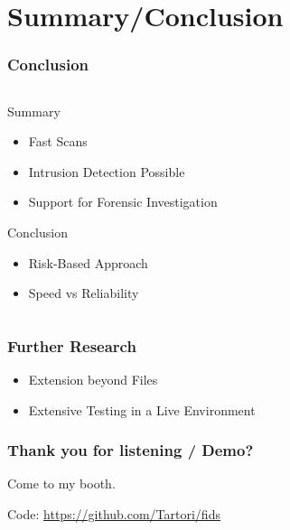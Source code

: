 \documentclass{beamer}
\begin{document}
\section{Summary/Conclusion}

\begin{frame}[fragile]
  \frametitle{Conclusion}
  \begin{columns}
    \begin{column}{1\textwidth}
      Summary
      \begin{itemize}
          \item Fast Scans
          \item Intrusion Detection Possible
          \item Support for Forensic Investigation
      \end{itemize}
      \pause
      Conclusion
      \begin{itemize}
        \item Risk-Based Approach
        \item Speed vs Reliability
      \end{itemize}
    \end{column}
  \end{columns}
\end{frame}

\begin{frame}[fragile]
  \frametitle{Further Research}
    \begin{itemize}
      \item Extension beyond Files
      \item Extensive Testing in a Live Environment
    \end{itemize}
\end{frame}


\begin{frame}
  \frametitle{Thank you for listening / Demo?}
  Come to my booth.

  Code: \url{https://github.com/Tartori/fids}
\end{frame}
\end{document}
